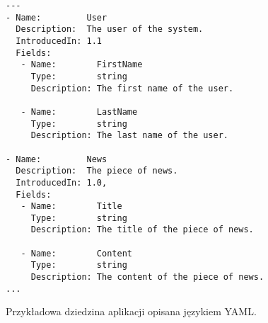 \begin{figure}[!ht]
\begin{verbatim}
---
- Name:         User
  Description:  The user of the system.
  IntroducedIn: 1.1
  Fields:
   - Name:        FirstName
     Type:        string
     Description: The first name of the user.
     
   - Name:        LastName
     Type:        string
     Description: The last name of the user.
   
- Name:         News
  Description:  The piece of news.
  IntroducedIn: 1.0,
  Fields:
   - Name:        Title
     Type:        string
     Description: The title of the piece of news.
     
   - Name:        Content
     Type:        string
     Description: The content of the piece of news.
...
\end{verbatim}

\caption{Przykładowa dziedzina aplikacji opisana językiem YAML.}
\label{fig:implementation_core:yaml}
\end{figure}
